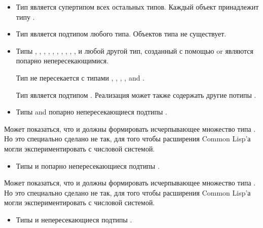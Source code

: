 \begin{itemize}
\item
Тип  является супертипом всех остальных типов. Каждый объект принадлежит
типу .

\item 
Тип {\nil} является подтипом любого типа.
Объектов типа {\nil} не существует.

\item
Типы , , , , ,
, , , ,
,  и любой другой тип, созданный с помощью
 or  являются попарно непересекающимися.

Тип  не пересекается с типами , ,
, , and .

Тип  является подтипом . Реализация может
также содержать другие потипы .
\end{itemize}

\begin{itemize}
\item
Типы  and  попарно непересекающиеся подтипы .
\end{itemize}

\beforenoterule
\begin{rationale}
Может показаться, что  и  должны формировать
исчерпывающее множество типа . Но это специально сделано не так, для
того чтобы расширения Common Lisp'а могли экспериментировать с числовой системой.
\end{rationale}
\afternoterule

\begin{itemize}
\item
Типы  и  попарно непересекающиеся подтипы .
\end{itemize}

\beforenoterule
\begin{rationale}
Может показаться, что  и  должны формировать
исчерпывающее множество типа . Но это специально сделано не так, для
того чтобы расширения Common Lisp'а могли экспериментировать с числовой системой.
\end{rationale}
\afternoterule

\begin{itemize}
\item
Типы  и  непересекающиеся подтипы .
\end{itemize}

